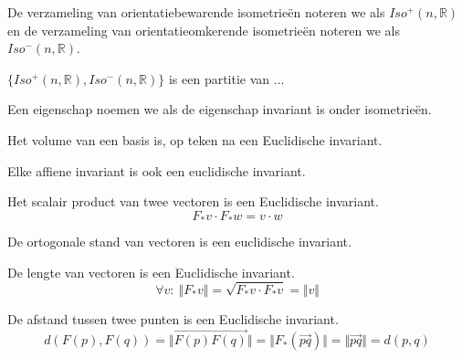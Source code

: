 \documentclass[main.tex]{subfiles}
\begin{document}
\begin{de}
  De verzameling van orientatiebewarende isometrie\"en noteren we als $Iso^{+}(n,\mathbb{R})$ en de verzameling van orientatieomkerende isometrie\"en noteren we als $Iso^{-}(n,\mathbb{R})$.
\end{de}

\begin{st}
  $\{ Iso^{+}(n,\mathbb{R}), Iso^{-}(n,\mathbb{R}) \}$ is een partitie van ...
\end{st}

\begin{de}
  Een eigenschap noemen we  als de eigenschap invariant is onder isometrie\"en.
\end{de}

\begin{st}
  Het volume van een basis is, op teken na een Euclidische invariant.
\end{st}

\begin{st}
  Elke affiene invariant is ook een euclidische invariant.
\end{st}

\begin{st}
  Het scalair product van twee vectoren is een Euclidische invariant.
\[ F_{*}v \cdot F_{*}w = v \cdot w \]
\end{st}

\begin{st}
  De ortogonale stand van vectoren is een euclidische invariant.
\end{st}

\begin{st}
  De lengte van vectoren is een Euclidische invariant.
\[ \forall v:\ \Vert F_{*}v \Vert = \sqrt{F_{*}v \cdot F_{*}v} = \Vert v \Vert \]
\end{st}

\begin{st}
  De afstand tussen twee punten is een Euclidische invariant.
\[ d(F(p),F(q)) = \Vert \overrightarrow{F(p)F(q)} \Vert = \Vert F_{*}(\overrightarrow{pq}) \Vert = \Vert \overrightarrow{pq} \Vert = d(p,q) \]
\end{st}
\end{document}
